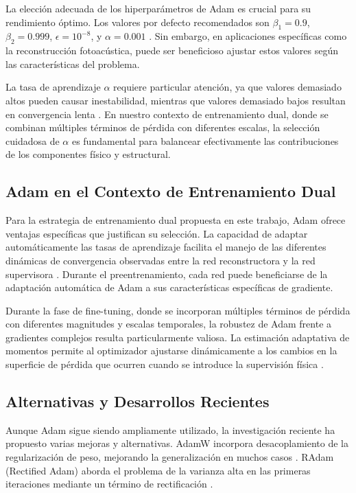 La elección adecuada de los hiperparámetros de Adam es crucial para su rendimiento óptimo. Los valores por defecto recomendados son $\beta_1 = 0.9$, $\beta_2 = 0.999$, $\epsilon = 10^{-8}$, y $\alpha = 0.001$ \cite{kingma2014adam}. Sin embargo, en aplicaciones específicas como la reconstrucción fotoacústica, puede ser beneficioso ajustar estos valores según las características del problema.

La tasa de aprendizaje $\alpha$ requiere particular atención, ya que valores demasiado altos pueden causar inestabilidad, mientras que valores demasiado bajos resultan en convergencia lenta \cite{smith2017cyclical}. En nuestro contexto de entrenamiento dual, donde se combinan múltiples términos de pérdida con diferentes escalas, la selección cuidadosa de $\alpha$ es fundamental para balancear efectivamente las contribuciones de los componentes físico y estructural.

\subsection{Adam en el Contexto de Entrenamiento Dual}

Para la estrategia de entrenamiento dual propuesta en este trabajo, Adam ofrece ventajas específicas que justifican su selección. La capacidad de adaptar automáticamente las tasas de aprendizaje facilita el manejo de las diferentes dinámicas de convergencia observadas entre la red reconstructora y la red supervisora \cite{zou2019sufficient}. Durante el preentrenamiento, cada red puede beneficiarse de la adaptación automática de Adam a sus características específicas de gradiente.

Durante la fase de fine-tuning, donde se incorporan múltiples términos de pérdida con diferentes magnitudes y escalas temporales, la robustez de Adam frente a gradientes complejos resulta particularmente valiosa. La estimación adaptativa de momentos permite al optimizador ajustarse dinámicamente a los cambios en la superficie de pérdida que ocurren cuando se introduce la supervisión física \cite{you2019large}.

\subsection{Alternativas y Desarrollos Recientes}

Aunque Adam sigue siendo ampliamente utilizado, la investigación reciente ha propuesto varias mejoras y alternativas. AdamW incorpora desacoplamiento de la regularización de peso, mejorando la generalización en muchos casos \cite{loshchilov2017decoupled}. RAdam (Rectified Adam) aborda el problema de la varianza alta en las primeras iteraciones mediante un término de rectificación \cite{liu2019variance}.

